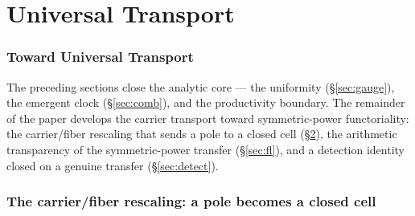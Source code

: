 \documentclass[11pt]{article}
\theoremstyle{definition}
\begin{document}
\part{Universal Transport}

\section{Toward Universal Transport}\label{sec:gue}

The preceding sections close the analytic core --- the uniformity (\S\ref{sec:gauge}), the emergent
clock (\S\ref{sec:comb}), and the productivity boundary. The remainder of the paper develops the
carrier transport toward symmetric-power functoriality: the carrier/fiber rescaling that sends a pole
to a closed cell (\S\ref{sec:carrier}), the arithmetic transparency of the symmetric-power transfer
(\S\ref{sec:fl}), and a detection identity closed on a genuine transfer (\S\ref{sec:detect}).

\section{The carrier/fiber rescaling: a pole becomes a closed cell}\label{sec:carrier}
\end{document}
